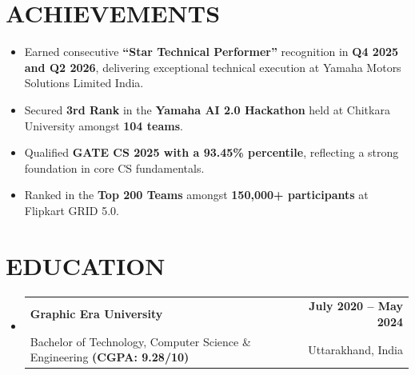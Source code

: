 \documentclass[letterpaper,10pt]{article}
\makeatletter
\renewcommand{\normalsize}{%
  \fontsize{10.1}{12.25}\selectfont
}
\newcommand{\resumeItem}[1]{
  \item\normalsize{
    {#1}
  }
}
\newcommand{\resumeSubheading}[4]{
  \item
    \begin{tabular*}{1.0\textwidth}[t]{l@{\extracolsep{\fill}}r}
      \textbf{\normalsize#1} & \textbf{\normalsize#2} \\
      {\normalsize#3} & {\normalsize#4} \\
    \end{tabular*}\vspace{1pt}
}
\newcommand{\resumeSubHeadingListStart}{\begin{itemize}[leftmargin=0.0in, label={}, itemsep=6pt, topsep=2pt]}
\newcommand{\resumeSubHeadingListEnd}{\end{itemize}}
\newcommand{\resumeItemListStart}{\begin{itemize}}
\newcommand{\resumeItemListEnd}{\end{itemize}\vspace{-3pt}}
\makeatother
\begin{document}
\section{ACHIEVEMENTS}
  \resumeItemListStart
    \resumeItem{Earned consecutive \textbf{``Star Technical Performer''} recognition in \textbf{Q4 2025 and Q2 2026}, delivering exceptional technical execution at Yamaha Motors Solutions Limited India.}
    \resumeItem{Secured \textbf{3rd Rank} in the \textbf{Yamaha AI 2.0 Hackathon} held at Chitkara University amongst \textbf{104 teams}.}
    \resumeItem{Qualified \textbf{GATE CS 2025 with a 93.45\% percentile}, reflecting a strong foundation in core CS fundamentals.}
    \resumeItem{Ranked in the \textbf{Top 200 Teams} amongst \textbf{150,000+ participants} at Flipkart GRID 5.0.}
  \resumeItemListEnd

\section{EDUCATION}
  \resumeSubHeadingListStart
    \resumeSubheading
      {Graphic Era University}{July 2020 -- May 2024}
      {Bachelor of Technology, Computer Science \& Engineering \textbf{(CGPA: 9.28/10)}}{Uttarakhand, India}
  \resumeSubHeadingListEnd
\end{document}

